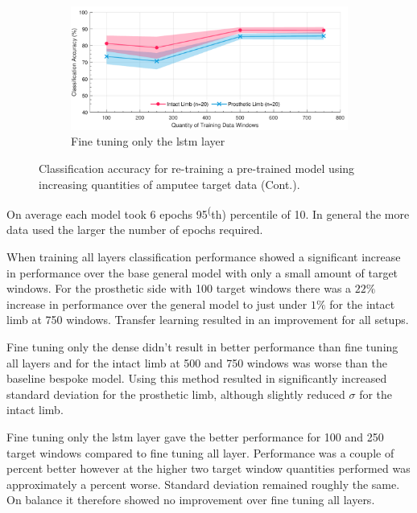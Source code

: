 \begin{figure}[t]\ContinuedFloat
    \centering
    \begin{subfigure}{\textwidth}
        \includegraphics[width=\textwidth]{content/6-Amputee/ch6_frozen_dense_layer_accuracy.pdf}
        \caption{Fine tuning only the \acrshort{lstm} layer}
    \end{subfigure}
    \caption[]{Classification accuracy for re-training a pre-trained model using increasing quantities of amputee target data (Cont.).}
\end{figure}

On average each model took 6 epochs 95\textsuperscript(th) percentile of 10. In general the more data used the larger the number of epochs required.

When training all layers classification performance showed a significant increase in performance over the base general model with only a small amount of target windows. For the prosthetic side with 100 target windows there was a $22\%$ increase in performance over the general model to just under $1\%$ for the intact limb at 750 windows. Transfer learning resulted in an improvement for all setups.

Fine tuning only the dense didn't result in better performance than fine tuning all layers and for the intact limb at 500 and 750 windows was worse than the baseline bespoke model. Using this method resulted in significantly increased standard deviation for the prosthetic limb, although slightly reduced $\sigma$ for the intact limb.

Fine tuning only the \acrshort{lstm} layer gave the better performance for 100 and 250 target windows compared to fine tuning all layer. Performance was a couple of percent better however at the higher two target window quantities performed was approximately a percent worse. Standard deviation remained roughly the same. On balance it therefore showed no improvement over fine tuning all layers.

